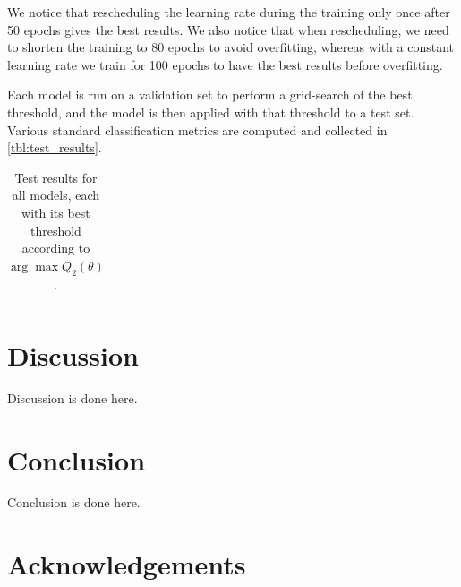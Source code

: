 \documentclass[10pt,conference]{IEEEtran}
\begin{document}
We notice that rescheduling the learning rate during the training only once after 50 epochs gives the best results.
We also notice that when rescheduling, we need to shorten the training to 80 epochs to avoid overfitting,
whereas with a constant learning rate we train for 100 epochs to have the best results before overfitting.

Each model is run on a validation set to perform a grid-search of the best threshold,
and the model is then applied with that threshold to a test set.
Various standard classification metrics are computed and collected in \autoref{tbl:test_results}.

%              

\begin{table}[!ht]
    \begin{center}
        \begin{tabular}{||c | c c c c c c||} 
             \hline
             
        \end{tabular}
    \end{center}
    \caption{Test results for all models, each with its best threshold according to $\arg\max Q_2(\theta)$.
    }
    \label{tbl:test_results}
\end{table}

\section{Discussion}
Discussion is done here.

\section{Conclusion}
Conclusion is done here.

\section*{Acknowledgements}



\end{document}
